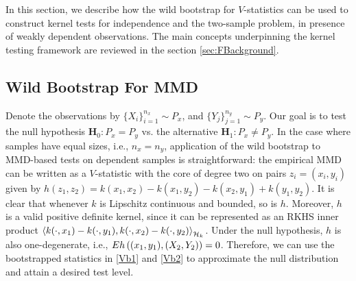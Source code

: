 In this section, we describe how the wild bootstrap for $V$-statistics can be used to construct kernel tests for independence and the two-sample problem, in presence of weakly dependent observations. The main concepts underpinning the kernel testing framework are reviewed in the section \ref{sec:FBackground}.

\subsection{Wild Bootstrap For MMD}
Denote the observations by $\{X_i\}_{i=1}^{n_x}\sim P_x$, and $\{Y_j\}_{j=1}^{n_y}\sim P_y$. Our goal is to test the null hypothesis $\mathbf H_0: P_x=P_y$ vs. 
the alternative $\mathbf H_1: P_x\neq P_y$. In the case where samples have equal sizes, i.e., $n_x=n_y$, application of the wild bootstrap to MMD-based tests on dependent samples is straightforward: the empirical MMD can be written as a $V$-statistic with the core of degree two on pairs $z_i=(x_i,y_i)$ given by $h(z_1,z_2) = k(x_1,x_2)- k(x_1,y_2) - k(x_2,y_1) + k(y_1,y_2)$. It is clear that whenever $k$ is Lipschitz continuous and bounded, so is $h$. Moreover, $h$ is a valid positive definite kernel, since it can be represented as an RKHS inner product  $\left\langle k(\cdot, x_1) -k(\cdot, y_1),k(\cdot, x_2) -k(\cdot, y_2) \right\rangle_{\mathcal{H}_k}$. Under the null hypothesis, $h$ is also one-degenerate, i.e., $E h\left((x_1,y_1),(X_2,Y_2)\right) = 0$. Therefore, we can use the bootstrapped statistics in \eqref{Vb1} and \eqref{Vb2} to approximate the null distribution and attain a desired test level.

